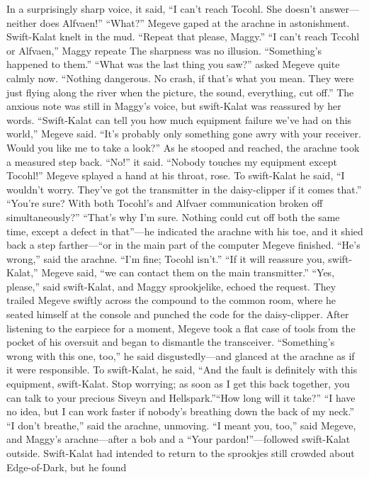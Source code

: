\documentclass[9pt]{article}
\begin{document}
In a surprisingly sharp voice, it said, “I can’t reach Tocohl. She doesn’t answer—neither does Alfvaen!”
“What?” Megeve gaped at the arachne in astonishment.
Swift-Kalat knelt in the mud. “Repeat that please, Maggy.”
“I can’t reach Tccohl or Alfvaen,” Maggy repeate The sharpness was no illusion. “Something’s
happened to them.”
“What was the last thing you saw?” asked Megeve quite calmly now.
“Nothing dangerous. No crash, if that’s what you mean. They were just flying along the river when
the picture, the sound, everything, cut off.” The anxious note was still in Maggy’s voice, but swift-Kalat
was reassured by her words.
“Swift-Kalat can tell you how much equipment failure we’ve had on this world,” Megeve said. “It’s
probably only something gone awry with your receiver. Would you like me to take a look?”
As he stooped and reached, the arachne took a measured step back. “No!” it said. “Nobody
touches my equipment except Tocohl!”
Megeve splayed a hand at his throat, rose. To swift-Kalat he said, “I wouldn’t worry. They’ve got
the transmitter in the daisy-clipper if it comes that.”
“You’re sure? With both Tocohl’s and Alfvaer communication broken off simultaneously?”
“That’s why I’m sure. Nothing could cut off both the same time, except a defect in that”—he
indicated the arachne with his toe, and it shied back a step farther—“or in the main part of the computer
Megeve finished.
“He’s wrong,” said the arachne. “I’m fine; Tocohl isn’t.”
“If it will reassure you, swift-Kalat,” Megeve said, “we can contact them on the main transmitter.”
“Yes, please,” said swift-Kalat, and Maggy sprookjelike, echoed the request. They trailed Megeve
swiftly across the compound to the common room, where he seated himself at the console and punched
the code for the daisy-clipper. After listening to the earpiece for a moment, Megeve took a flat case of
tools from the pocket of his oversuit and began to dismantle the transceiver.
“Something’s wrong with this one, too,” he said disgustedly—and glanced at the arachne as if it were
responsible. To swift-Kalat, he said, “And the fault is definitely with this equipment, swift-Kalat. Stop
worrying; as soon as I get this back together, you can talk to your precious Siveyn and Hellspark.”“How long will it take?”
“I have no idea, but I can work faster if nobody’s breathing down the back of my neck.”
“I don’t breathe,” said the arachne, unmoving.
“I meant you, too,” said Megeve, and Maggy’s arachne—after a bob and a “Your
pardon!”—followed swift-Kalat outside.
Swift-Kalat had intended to return to the sprookjes still crowded about Edge-of-Dark, but he found
\end{document}
